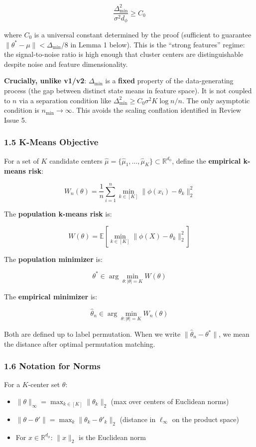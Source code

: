 \documentclass[
  12pt,
]{article}
\providecommand{\tightlist}{%
  \setlength{\itemsep}{0pt}\setlength{\parskip}{0pt}}
\begin{document}
\[\frac{\Delta_{\min}^2}{\sigma^2 d_\phi} \geq C_0\]

where \(C_0\) is a universal constant determined by the proof
(sufficient to guarantee \(\|\theta^* - \mu\| < \Delta_{\min}/8\) in
Lemma 1 below). This is the ``strong features'' regime: the
signal-to-noise ratio is high enough that cluster centers are
distinguishable despite noise and feature dimensionality.

\textbf{Crucially, unlike v1/v2}: \(\Delta_{\min}\) is a \textbf{fixed}
property of the data-generating process (the gap between distinct state
means in feature space). It is not coupled to \(n\) via a separation
condition like \(\Delta_{\min}^2 \geq C_0 \sigma^2 K \log n / n\). The
only asymptotic condition is \(n_{\min} \to \infty\). This avoids the
scaling conflation identified in Review Issue 5.

\subsubsection{1.5 K-Means Objective}\label{k-means-objective}

For a set of \(K\) candidate centers
\(\hat{\mu} = \{\hat{\mu}_1, \dots, \hat{\mu}_K\} \subset \mathbb{R}^{d_\phi}\),
define the \textbf{empirical k-means risk}:

\[W_n(\theta) = \frac{1}{n} \sum_{i=1}^n \min_{k \in [K]} \|\phi(x_i) - \theta_k\|_2^2\]

The \textbf{population k-means risk} is:

\[W(\theta) = \mathbb{E}\left[\min_{k \in [K]} \|\phi(X) - \theta_k\|_2^2\right]\]

The \textbf{population minimizer} is:

\[\theta^* \in \arg \min_{\theta: |\theta| = K} W(\theta)\]

The \textbf{empirical minimizer} is:

\[\hat{\theta}_n \in \arg \min_{\theta: |\theta| = K} W_n(\theta)\]

Both are defined up to label permutation. When we write
\(\|\hat{\theta}_n - \theta^*\|\), we mean the distance after optimal
permutation matching.

\subsubsection{1.6 Notation for Norms}\label{notation-for-norms}

For a \(K\)-center set \(\theta\):

\begin{itemize}
\tightlist
\item
  \(\|\theta\|_\infty = \max_{k \in [K]} \|\theta_k\|_2\) (max over
  centers of Euclidean norms)
\item
  \(\|\theta - \theta'\| = \max_{k} \|\theta_k - \theta'_k\|_2\)
  (distance in \(\ell_\infty\) on the product space)
\item
  For \(x \in \mathbb{R}^{d_\phi}\): \(\|x\|_2\) is the Euclidean norm
\end{itemize}
\end{document}
